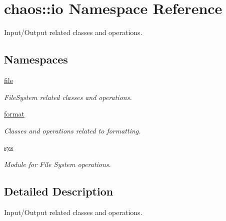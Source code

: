 \hypertarget{namespacechaos_1_1io}{}\section{chaos\+:\+:io Namespace Reference}
\label{namespacechaos_1_1io}


Input/\+Output related classes and operations.  


\subsection*{Namespaces}
\begin{DoxyCompactItemize}
\item 
 \hyperlink{namespacechaos_1_1io_1_1file}{file}
\begin{DoxyCompactList}\small\item\em File\+System related classes and operations. \end{DoxyCompactList}\item 
 \hyperlink{namespacechaos_1_1io_1_1format}{format}
\begin{DoxyCompactList}\small\item\em Classes and operations related to formatting. \end{DoxyCompactList}\item 
 \hyperlink{namespacechaos_1_1io_1_1sys}{sys}
\begin{DoxyCompactList}\small\item\em Module for File System operations. \end{DoxyCompactList}\end{DoxyCompactItemize}


\subsection{Detailed Description}
Input/\+Output related classes and operations. 